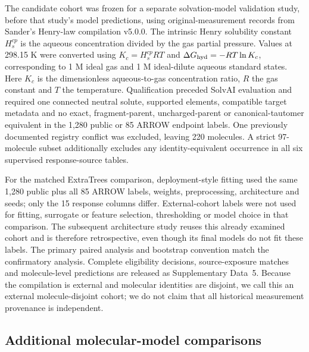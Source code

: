 \documentclass[12pt]{article}
\begin{document}
The candidate cohort was frozen for a separate solvation-model validation study,
before that study's model predictions, using original-measurement records from
Sander's Henry-law compilation v5.0.0.\cite{sander2023}
The intrinsic Henry solubility constant $H_s^{cp}$ is the aqueous concentration
divided by the gas partial pressure. Values at 298.15 K were converted using
$K_c=H_s^{cp}RT$ and $\Delta G_{\rm hyd}=-RT\ln K_c$, corresponding to 1 M ideal
gas and 1 M ideal-dilute aqueous standard states. Here $K_c$ is the dimensionless
aqueous-to-gas concentration ratio, $R$ the gas constant and $T$ the temperature.
Qualification preceded SolvAI
evaluation and required one connected neutral solute, supported elements, compatible
target metadata and no exact, fragment-parent, uncharged-parent or canonical-tautomer
equivalent in the 1,280 public or 85 ARROW endpoint labels. One previously
documented registry conflict was excluded, leaving 220 molecules. A strict
97-molecule subset additionally excludes any identity-equivalent occurrence in all
six supervised response-source tables.

For the matched ExtraTrees comparison, deployment-style fitting used the same 1,280 public plus all 85
ARROW labels, weights, preprocessing, architecture and seeds; only the 15 response
columns differ. External-cohort labels were not used for fitting, surrogate or feature
selection, thresholding or model choice in that comparison. The subsequent architecture
study reuses this already examined cohort and is therefore retrospective, even though
its final models do not fit these labels. The primary paired analysis and bootstrap
convention match the confirmatory analysis. Complete eligibility decisions,
source-exposure matches and molecule-level predictions are released as Supplementary
Data~5. Because the compilation is external and molecular identities are disjoint,
we call this an external molecule-disjoint cohort; we do not claim that all historical
measurement provenance is independent.

\subsection*{Additional molecular-model comparisons}
\end{document}

